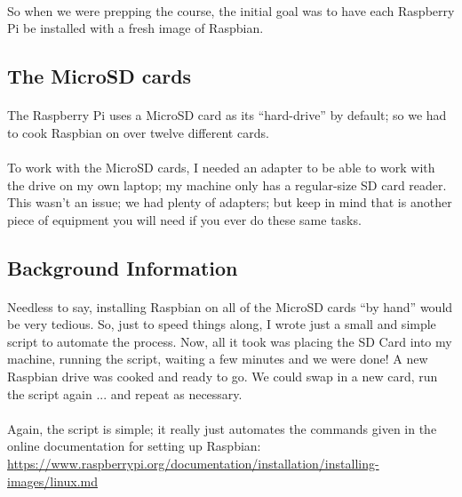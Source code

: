 \documentclass[11pt]{article}
\begin{document}
	\paragraph{} So when we were prepping the course, the initial goal was to have each Raspberry Pi be installed with a fresh image of Raspbian. 


	\subsection{The MicroSD cards} 

	\paragraph{} The Raspberry Pi uses a MicroSD card as its ``hard-drive'' by default; so we had to cook Raspbian on over twelve different cards.

	\paragraph{} To work with the MicroSD cards, I needed an adapter to be able to work with the drive on my own laptop; my machine only has a regular-size SD card reader. This wasn't an issue; we had plenty of adapters; but keep in mind that is another piece of equipment you will need if you ever do these same tasks.

	\subsection{Background Information}

	\paragraph{} Needless to say, installing Raspbian on all of the MicroSD cards ``by hand'' would be very tedious. So, just to speed things along, I wrote just a small and simple script to automate the process. Now, all it took was placing the SD Card into my machine, running the script, waiting a few minutes and we were done! A new Raspbian drive was cooked and ready to go. We could swap in a new card, run the script again ... and repeat as necessary.

	\paragraph{} Again, the script is simple; it really just automates the commands given in the online documentation for setting up Raspbian: \href{https://www.raspberrypi.org/documentation/installation/installing-images/linux.md}{https://www.raspberrypi.org/documentation/installation/installing-images/linux.md}
\end{document}
